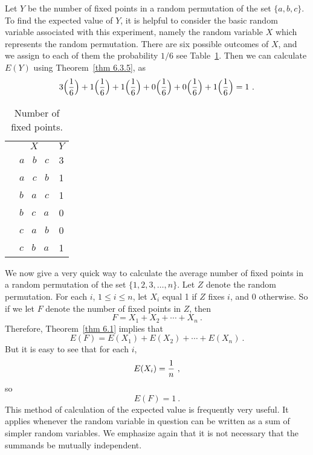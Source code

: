\begin{example}\label{exam 6.1} Let $Y$ be the number of fixed points in a random
permutation of the set
$\{a,b,c\}$.  To find the expected value of $Y$, it is helpful to consider the basic
random variable associated with this experiment, namely the random variable $X$ which
represents the random permutation.  There are six possible outcomes of $X$, and we
assign to each of them the probability $1/6$ see Table~\ref{table 6.3}.  Then we can calculate $E(Y)$ using
Theorem~\ref{thm 6.3.5}, as
$$3\Bigl({1\over 6}\Bigr) + 1\Bigl({1\over 6}\Bigr) + 1\Bigl({1\over 6}\Bigr) +
0\Bigl({1\over 6}\Bigr) +  0\Bigl({1\over 6}\Bigr) + 1\Bigl({1\over 6}\Bigr) = 1\ .
$$
\begin{table}
\centering
\begin{tabular}{ccc} &                          & \\ 
\hline &$X$                 & $Y$ \\
\hline  &$a\;\;\;b\;\;\;   c$       & 3 \\  &$a\;\;\; c\;\;\;  b$       & 1 \\ 
&$b\;\;\; a\;\;\;  c$       & 1 \\  &$b\;\;\; c\;\;\;  a$       & 0 \\  &$c\;\;\;
a\;\;\;  b$       & 0 \\  &$c\;\;\; b\;\;\;  a$       & 1 \\ 
\hline
\end{tabular}
\caption{Number of fixed points.}
\label{table 6.3}
\end{table}

\par  We now give a very quick way to calculate the average number of fixed points in
a random permutation of the set $\{1, 2, 3, \ldots, n\}$.  Let $Z$ denote the random
permutation.  For each $i$, $1 \le i \le n$, let $X_i$ equal 1 if $Z$ fixes $i$, and
0 otherwise.  So if we let $F$ denote the number of fixed points in $Z$, then
$$F = X_1 + X_2 + \cdots + X_n\ .$$ Therefore, Theorem~\ref{thm 6.1} implies that
$$E(F) = E(X_1) + E(X_2) + \cdots + E(X_n)\ .$$ But it is easy to see that for each
$i$,
$$E(X_i) = {1\over n}\ ,$$ so
$$E(F) = 1\ .$$ This method of calculation of the expected value is frequently very
useful.  It applies whenever the random variable in question can be written as a sum
of simpler random variables.  We emphasize again that it is not necessary that the
summands be mutually independent.
\end{example}

